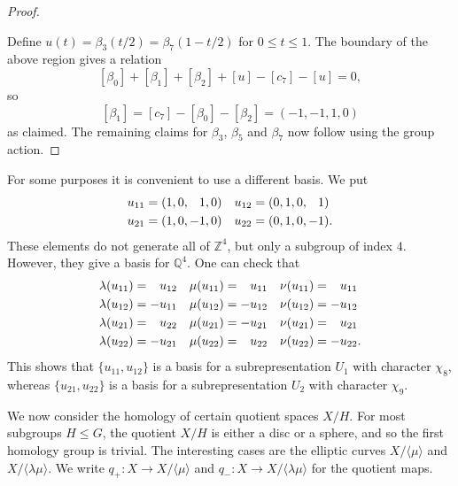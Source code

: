 \documentclass[reqno]{amsart}
\newcommand{\bt}        {\beta}
\newcommand{\lm}        {\lambda}
\newcommand{\Z}         {{\mathbb{Z}}}
\newcommand{\Q}         {{\mathbb{Q}}}
\newcommand{\ip}[1]     {\langle #1\rangle}
\newcommand{\pp}        {\hphantom{+}}
\renewcommand{\:}{\colon}
\theoremstyle{definition}
\begin{document}
\begin{proof}
\begin{center}
 \end{center}
 Define $u(t)=\bt_3(t/2)=\bt_7(1-t/2)$ for $0\leq t\leq 1$.  The
 boundary of the above region gives a relation
 \[ [\bt_0] + [\bt_1] + [\bt_2] + [u] - [c_7] - [u] = 0, \]
 so
 \[ [\bt_1] = [c_7] - [\bt_0] - [\bt_2] = (-1,-1,1,0) \]
 as claimed.  The remaining claims for $\bt_3$, $\bt_5$ and $\bt_7$
 now follow using the group action.
\end{proof}

For some purposes it is convenient to use a different basis.  We put
\begin{align*}
 u_{11} &= ( 1,0,\pp 1,0) & u_{12} &= (0, 1,0,\pp 1) \\
 u_{21} &= ( 1,0,-1,0) & u_{22} &= (0, 1,0,-1).
\end{align*}
These elements do not generate all of $\Z^4$, but only a subgroup of
index $4$.  However, they give a basis for $\Q^4$.  One can check that
\begin{align*}
 \lm(u_{11}) &= \pp u_{12} & \mu(u_{11}) &= \pp u_{11} & \nu(u_{11}) &= \pp u_{11} \\
 \lm(u_{12}) &=    -u_{11} & \mu(u_{12}) &=    -u_{12} & \nu(u_{12}) &=    -u_{12} \\
 \lm(u_{21}) &= \pp u_{22} & \mu(u_{21}) &=    -u_{21} & \nu(u_{21}) &= \pp u_{21} \\
 \lm(u_{22}) &=    -u_{21} & \mu(u_{22}) &= \pp u_{22} & \nu(u_{22}) &=    -u_{22}.
\end{align*}
This shows that $\{u_{11},u_{12}\}$ is a basis for a subrepresentation
$U_1$ with character $\chi_8$, whereas $\{u_{21},u_{22}\}$ is a basis
for a subrepresentation $U_2$ with character $\chi_9$.

We now consider the homology of certain quotient spaces $X/H$.  For
most subgroups $H\leq G$, the quotient $X/H$ is either a disc or a
sphere, and so the first homology group is trivial.  The interesting
cases are the elliptic curves $X/\ip{\mu}$ and $X/\ip{\lm\mu}$.  We
write $q_+\:X\to X/\ip{\mu}$ and $q_-\:X\to X/\ip{\lm\mu}$ for the
quotient maps.
\end{document}

